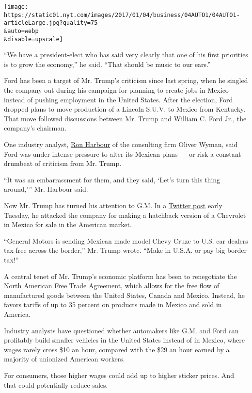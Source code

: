 \texttt{[image: https://static01.nyt.com/images/2017/01/04/business/04AUTO1/04AUTO1-articleLarge.jpg?quality=75\\\&auto=webp\\\&disable=upscale]}

``We have a president-elect who has said very clearly that one of his
first priorities is to grow the economy,'' he said. ``That should be
music to our ears.''

Ford has been a target of Mr. Trump's criticism since last spring, when
he singled the company out during his campaign for planning to create
jobs in Mexico instead of pushing employment in the United States. After
the election, Ford dropped plans to move production of a Lincoln S.U.V.
to Mexico from Kentucky. That move followed discussions between Mr.
Trump and William C. Ford Jr., the company's chairman.

One industry analyst,
\href{http://www.oliverwyman.com/our-culture/our-people/ron-harbour.html}{Ron
Harbour} of the consulting firm Oliver Wyman, said Ford was under
intense pressure to alter its Mexican plans --- or risk a constant
drumbeat of criticism from Mr. Trump.

``It was an embarrassment for them, and they said, `Let's turn this
thing around,''' Mr. Harbour said.

Now Mr. Trump has turned his attention to G.M. In a
\href{https://twitter.com/realDonaldTrump/status/816260343391514624}{Twitter
post} early Tuesday, he attacked the company for making a hatchback
version of a Chevrolet in Mexico for sale in the American market.

``General Motors is sending Mexican made model Chevy Cruze to U.S. car
dealers tax-free across the border,'' Mr. Trump wrote. ``Make in U.S.A.
or pay big border tax!''

A central tenet of Mr. Trump's economic platform has been to renegotiate
the North American Free Trade Agreement, which allows for the free flow
of manufactured goods between the United States, Canada and Mexico.
Instead, he favors tariffs of up to 35 percent on products made in
Mexico and sold in America.

Industry analysts have questioned whether automakers like G.M. and Ford
can profitably build smaller vehicles in the United States instead of in
Mexico, where wages rarely cross \$10 an hour, compared with the \$29 an
hour earned by a majority of unionized American workers.

For consumers, those higher wages could add up to higher sticker prices.
And that could potentially reduce sales.

